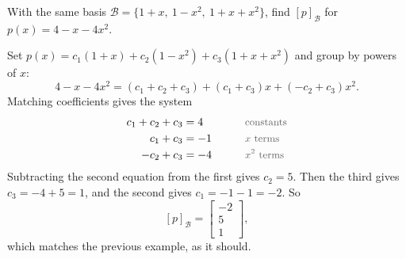 \begin{example}
With the same basis $\mathcal{B} = \{1 + x, \ 1 - x^2, \ 1 + x + x^2\}$, find $[p]_{\mathcal{B}}$ for $p(x) = 4 - x - 4x^2$.

\begin{solution}
Set $p(x) = c_1(1 + x) + c_2(1 - x^2) + c_3(1 + x + x^2)$ and group by powers of $x$:
\[
4 - x - 4x^2 = (c_1 + c_2 + c_3) + (c_1 + c_3)x + (-c_2 + c_3)x^2.
\]
Matching coefficients gives the system
\begin{alignat*}{2}
c_1 + c_2 + c_3 &= 4 &\qquad& \by{constants} \\
c_1 + c_3 &= -1 && \by{$x$ terms} \\
-c_2 + c_3 &= -4 && \by{$x^2$ terms}
\end{alignat*}
Subtracting the second equation from the first gives $c_2 = 5$. Then the third gives $c_3 = -4 + 5 = 1$, and the second gives $c_1 = -1 - 1 = -2$. So
\[
[p]_{\mathcal{B}} = \begin{bmatrix} -2 \\ 5 \\ 1 \end{bmatrix},
\]
which matches the previous example, as it should.
\end{solution}
\end{example}

